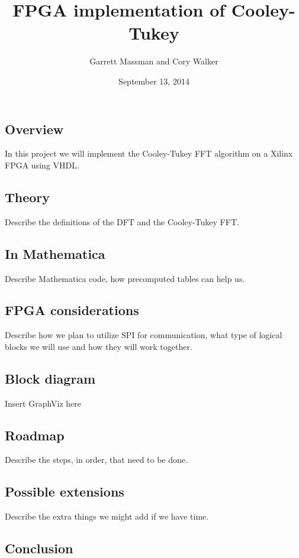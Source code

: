 \documentclass[12pt]{article}
\title{FPGA implementation of Cooley-Tukey}
\date{September 13, 2014}
\author{Garrett Massman and Cory Walker}
\begin{document}
  \maketitle

  \subsection*{Overview}
    In this project we will implement the Cooley-Tukey FFT algorithm on a Xilinx FPGA using VHDL.
  \subsection*{Theory}
    Describe the definitions of the DFT and the Cooley-Tukey FFT.
  \subsection*{In Mathematica}
    Describe Mathematica code, how precomputed tables can help us.
  \subsection*{FPGA considerations}
    Describe how we plan to utilize SPI for communication, what type of logical blocks we will use and how they will work together.
  \subsection*{Block diagram}
    Insert GraphViz here
  \subsection*{Roadmap}
    Describe the steps, in order, that need to be done.
  \subsection*{Possible extensions}
    Describe the extra things we might add if we have time.
  \subsection*{Conclusion}
\end{document}
